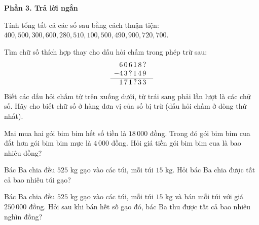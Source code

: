 \textbf{Phần 3. Trả lời ngắn}

\begin{ex} %
Tính tổng tất cả các số sau bằng cách thuận tiện: $400, 500, 300, 600, 280, 510, 100, 500, 490, 900, 720, 700$.
\end{ex}

\begin{ex} %
Tìm chữ số thích hợp thay cho dấu hỏi chấm trong phép trừ sau:
\[
\begin{array}{r@{}l@{\quad}l}
  & 6\,0\,6\,1\,8\,? \\
- & 4\,3\,?\,1\,4\,9 \\
\hline
  & 1\,7\,1\,?\,3\,3
\end{array}
\]
Biết các dấu hỏi chấm từ trên xuống dưới, từ trái sang phải lần lượt là các chữ số. Hãy cho biết chữ số ở hàng đơn vị của số bị trừ (dấu hỏi chấm ở dòng thứ nhất).
\end{ex}

\begin{ex} %
Mai mua hai gói bim bim hết số tiền là $18\,000$ đồng. Trong đó gói bim bim cua đắt hơn gói bim bim mực là $4\,000$ đồng. Hỏi giá tiền gói bim bim cua là bao nhiêu đồng?
\end{ex}

\begin{ex} %
Bác Ba chia đều $525\text{ kg}$ gạo vào các túi, mỗi túi $15\text{ kg}$. Hỏi bác Ba chia được tất cả bao nhiêu túi gạo?
\end{ex}

\begin{ex} %
Bác Ba chia đều $525\text{ kg}$ gạo vào các túi, mỗi túi $15\text{ kg}$ và bán mỗi túi với giá $250\,000$ đồng. Hỏi sau khi bán hết số gạo đó, bác Ba thu được tất cả bao nhiêu nghìn đồng?
\end{ex}


